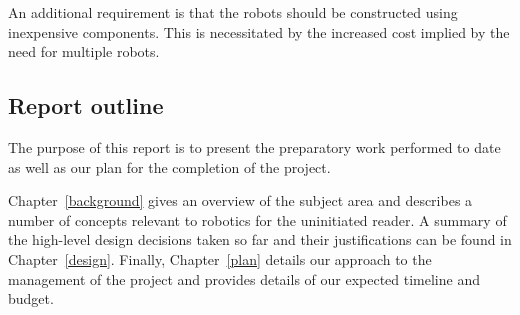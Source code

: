 An additional requirement is that the robots should be constructed using
inexpensive components. This is necessitated by the increased cost implied by the
need for multiple robots.

\subsection{Report outline}\label{introduction/outline}

The purpose of this report is to present the preparatory work
performed to date as well as our plan for the completion of the
project.

Chapter~\ref{background} gives an overview of the subject area and describes
a number of concepts relevant to robotics for the uninitiated reader.
A summary of the high-level design
decisions taken so far and their justifications can be found in
Chapter~\ref{design}. Finally, Chapter~\ref{plan} details our approach to
the management of the project and provides details of our expected
timeline and budget.
